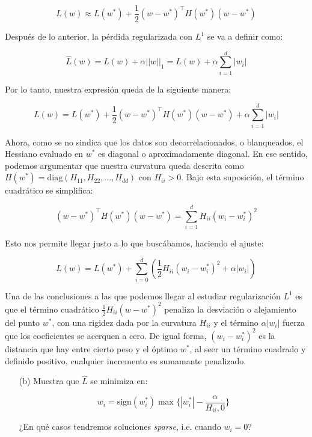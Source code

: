 \[
    L(w) \approx L(w^*) + \frac{1}{2} (w - w^*)^\top H(w^*)(w - w^*)
\]

Después de lo anterior, la pérdida regularizada con $L^1$ se va a definir como:

\[
    \hat{L}(w) = L(w) + \alpha ||w||_1 = L(w) + \alpha \sum_{i=1}^d |w_i|
\]

Por lo tanto, nuestra expresión queda de la siguiente manera:

\[
    L(w) = L(w^*) + \frac{1}{2} (w - w^*)^\top H(w^*) (w - w^*) + \alpha \sum_{i=1}^{d} |w_i|
\]

Ahora, como se no sindica que los datos son decorrelacionados, o blanqueados, el Hessiano evaluado
en $w^*$ es diagonal o aproximadamente diagonal. En ese sentido, podemos argumentar que nuestra curvatura
queda descrita como $H(w^*) = \text{diag}(H_{11}, H_{22}, ..., H_{dd})$ con $H_{ii} > 0$. Bajo esta 
suposición, el término cuadrático se simplifica: 

\[
    (w - w^*)^\top H(w^*) (w - w^*) = \sum_{i=1}^{d} H_{ii} (w_i - w_i^*)^2
\]

Esto nos permite llegar justo a lo que buscábamos, haciendo el ajuste:

\[
    L(w) = L(w^*) + \sum_{i=0}^{d} (\frac{1}{2} H_{ii} (w_i - w_i^*)^2 + \alpha |w_i|)
\]

Una de las conclusiones a las que podemos llegar al estudiar regularización $L^1$ es que el término
cuadrático $\frac{1}{2} H_{ii} (w - w^*)^2$ penaliza la desviación o alejamiento del punto $w^*$, con una 
rigidez dada por la curvatura $H_{ii}$ y el término $\alpha |w_i|$ fuerza que los coeficientes se acerquen
a cero. De igual forma, $(w_i - w_i^*)^2$ es la distancia que hay entre cierto peso y el óptimo $w^*$, al 
seer un término cuadrado y definido positivo, cualquier incremento es sumamante penalizado. \\



\begin{myblock}

\begin{itemize}
    \item[(b)] Muestra que $\hat{L}$ se minimiza en:
    
    \[
        w_i = \text{sign}(w_i^*) \max{ \bigg\{ |w_i^*| - \frac{\alpha}{H_{ii}, 0}\bigg\} }
    \]

    ¿En qué casos tendremos soluciones \textit{sparse}, i.e. cuando $w_i = 0$?
\end{itemize}

\end{myblock}


